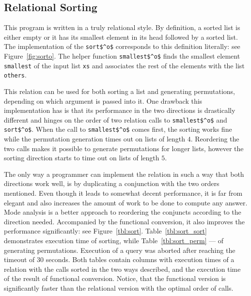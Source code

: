 \subsection{Relational Sorting}


This program is written in a truly relational style.
By definition, a sorted list is either empty or it has its smallest element in its head followed by a sorted list.
The implementation of the \lstinline{sort$^o$} corresponds to this definition literally: see Figure~\ref{fig:sorto}.
The helper function \lstinline{smallest$^o$} finds the smallest element \lstinline{smallest} of the input list \lstinline{xs} and associates the rest of the elements with the list \lstinline{others}.



This relation can be used for both sorting a list and generating permutations, depending on which argument is passed into it.
One drawback this implementation has is that its performance in the two directions is drastically different and hinges on the order of two relation calls to \lstinline{smallest$^o$} and \lstinline{sort$^o$}.
When the call to \lstinline{smallest$^o$} comes first, the sorting works fine while the permutation generation times out on lists of length $4$.
Reordering the two calls makes it possible to generate permutations for longer lists, however the sorting direction starts to time out on lists of length $5$.

The only way a programmer can implement the relation in such a way that both directions work well, is by duplicating a conjunction with the two orders mentioned.
Even though it leads to somewhat decent performance, it is far from elegant and also increases the amount of work to be done to compute any answer.
Mode analysis is a better approach to reordering the conjuncts according to the direction needed.
Accompanied by the functional conversion, it also improves the performance significantly: see Figure~\ref{tbl:sort}.
Table~\ref{tbl:sort_sort} demonstrates execution time of sorting, while Table~\ref{tbl:sort_perm} --- of generating permutations.
Execution of a query was aborted after reaching the timeout of 30 seconds.
Both tables contain columns with execution times of a relation with the calls sorted in the two ways described, and the execution time of the result of functional conversion.
Notice, that the functional version is significantly faster than the relational version with the optimal order of calls.



